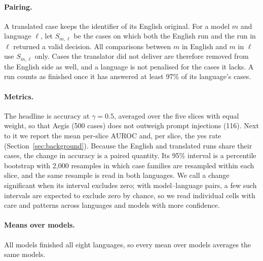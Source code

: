 \paragraph{Pairing.} A translated case keeps the identifier of its English
original. For a model $m$ and language $\ell$, let $S_{m,\ell}$ be the cases on
which both the English run and the run in $\ell$ returned a valid decision. All
comparisons between $m$ in English and $m$ in $\ell$ use $S_{m,\ell}$ only.
Cases the translator did not deliver are therefore removed from the English
side as well, and a language is not penalised for the cases it lacks. A run
counts as finished once it has answered at least 97\% of its language's cases.

\paragraph{Metrics.} The headline is accuracy at $\gamma = 0.5$, averaged over
the five slices with equal weight, so that Aegis (500 cases) does not outweigh
prompt injections (116). Next to it we report the mean per-slice AUROC and,
per slice, the yes rate (Section~\ref{sec:background}). Because the English
and translated runs share their cases, the change in accuracy is a paired
quantity. Its 95\% interval is a percentile bootstrap with 2{,}000 resamples
in which case families are resampled within each slice, and the same resample
is read in both languages. We call a change significant when its interval
excludes zero; with \MLnPairs{} model--language pairs, a few such intervals are
expected to exclude zero by chance, so we read individual cells with care and
patterns across languages and models with more confidence.

\paragraph{Means over models.} All \MLnModels{} models finished all eight
languages, so every mean over models averages the same \MLnModels{} models.
